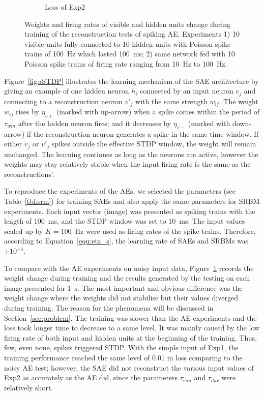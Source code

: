 \begin{figure}
\begin{subfigure}[t]{0.45\textwidth}
		\caption{Loss of Exp2}
	\end{subfigure}
	\caption{Weights and firing rates of visible and hidden units change during training of the reconstruction tests of spiking AE. 
		Experiments 1) 10 visible units fully connected to 10 hidden units with Poisson spike trains of 100~Hz which lasted 100~ms; 2) same network fed with 10 Poisson spike trains of firing rate ranging from 10~Hz to 100~Hz.}
	\label{fig:SAE_orig}
\end{figure}

Figure~\ref{fig:rSTDP} illustrates the learning mechanism of the SAE architecture by giving an example of one hidden neuron $h_i$ connected by an input neuron $v_j$ and connecting to a reconstruction neuron $v'_j$ with the same strength $w_{ij}$.
The weight $w_{ij}$ rises by $\eta_{s+}$ (marked with up-arrow) when a spike comes within the period of $\tau_{win}$ after the hidden neuron fires;
and it decreases by $\eta_{s-}$ (marked with down-arrow) if the reconstruction neuron generates a spike in the same time window.
If either $v_j$ or $v'_j$ spikes outside the effective STDP window, the weight will remain unchanged.
The learning continues as long as the neurons are active, however the weights may stay relatively stable when the input firing rate is the same as the reconstructions'.

To reproduce the experiments of the AEs, we selected the parameters (see Table~\ref{tbl:srm}) for training SAEs and also apply the same parameters for SRBM experiments.
Each input vector (image) was presented as spiking trains with the length of 100~ms, and the STDP window was set to 10~ms.
The input values scaled up by $K=100$~Hz were used as firing rates of the spike trains.
Therefore, according to Equation~\ref{equ:eta_s}, the learning rate of SAEs and SRBMs was $\pm 10^{-4}$.

To compare with the AE experiments on noisy input data, Figure~\ref{fig:SAE_orig} records the weight change during training and the results generated by the testing on each image presented for 1~s.
The most important and obvious difference was the weight change where the weights did not stabilise but their values diverged during training.
The reason for the phenomena will be discussed in Section~\ref{sec:problem}.
The training was slower than the AE experiments and the loss took longer time to decrease to a same level.
It was mainly caused by the low firing rate of both input and hidden units at the beginning of the training.
Thus, few, even none, spikes triggered STDP.
With the simple input of Exp1, the training performance reached the same level of 0.01 in loss comparing to the noisy AE test;
however, the SAE did not reconstruct the various input values of Exp2 as accurately as the AE did, since the parameters $\tau_{win}$ and $\tau_{dur}$ were relatively short.

